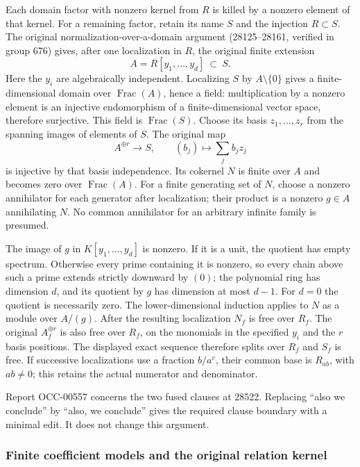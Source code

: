 Each domain factor with nonzero kernel from \(R\) is killed by a nonzero element of that kernel. For a remaining factor, retain its name \(S\) and the injection \(R\subset S\). The original normalization-over-a-domain argument (28125--28161, verified in group 676) gives, after one localization in \(R\), the original finite extension \[
 A=R[y_1,\ldots,y_d]\ \subset\ S.
\] Here the \(y_i\) are algebraically independent. Localizing \(S\) by \(A\setminus\{0\}\) gives a finite-dimensional domain over \(\operatorname{Frac}(A)\), hence a field: multiplication by a nonzero element is an injective endomorphism of a finite-dimensional vector space, therefore surjective. This field is \(\operatorname{Frac}(S)\). Choose its basis \(z_1,\ldots,z_r\) from the spanning images of elements of \(S\). The original map \[
 A^{\oplus r}\longrightarrow S,\qquad (b_j)\longmapsto\sum_j b_jz_j
\] is injective by that basis independence. Its cokernel \(N\) is finite over \(A\) and becomes zero over \(\operatorname{Frac}(A)\). For a finite generating set of \(N\), choose a nonzero annihilator for each generator after localization; their product is a nonzero \(g\in A\) annihilating \(N\). No common annihilator for an arbitrary infinite family is presumed.

The image of \(g\) in \(K[y_1,\ldots,y_d]\) is nonzero. If it is a unit, the quotient has empty spectrum. Otherwise every prime containing it is nonzero, so every chain above such a prime extends strictly downward by \((0)\); the polynomial ring has dimension \(d\), and its quotient by \(g\) has dimension at most \(d-1\). For \(d=0\) the quotient is necessarily zero. The lower-dimensional induction applies to \(N\) as a module over \(A/(g)\). After the resulting localization \(N_f\) is free over \(R_f\). The original \(A_f^{\oplus r}\) is also free over \(R_f\), on the monomials in the specified \(y_i\) and the \(r\) basis positions. The displayed exact sequence therefore splits over \(R_f\) and \(S_f\) is free. If successive localizations use a fraction \(b/a^v\), their common base is \(R_{ab}\), with \(ab\ne0\); this retains the actual numerator and denominator.

Report OCC-00557 concerns the two fused clauses at 28522. Replacing ``also we conclude'' by ``also, we conclude'' gives the required clause boundary with a minimal edit. It does not change this argument.

\subsubsection{Finite coefficient models and the original relation kernel}\label{algebra-proof-027-finite-coefficient-models-and-the-original-relation-kernel}

